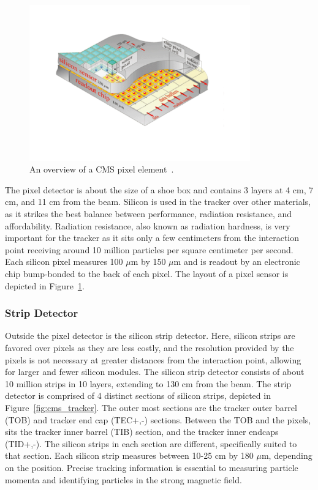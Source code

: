 \begin{figure}[hbtp]
 \begin{center}
   \includegraphics[width=0.85\textwidth]{ch3_figs/cms_pixel.pdf}
   \caption[CMS silicon pixel element]{An overview of a CMS pixel element~\cite{cms_pixel}.}
   \label{fig:cms_pixel}
 \end{center}
\end{figure}

\noindent The pixel detector is about the size of a shoe box and contains 3 layers at 4 cm, 7 cm, and 11 cm from the beam.
Silicon is used in the tracker over other materials, as it strikes the best balance between performance, radiation resistance, and affordability. 
Radiation resistance, also known as radiation hardness, is very important for the tracker as it sits only a few centimeters from the interaction point
receiving around 10 million particles per square centimeter per second.
Each silicon pixel measures 100 $\mu$m by 150 $\mu$m and is readout by an electronic chip bump-bonded to the back of each pixel. The layout of a pixel sensor is depicted in
Figure~\ref{fig:cms_pixel}.  

\subsubsection{Strip Detector}
Outside the pixel detector is the silicon strip detector. Here, silicon strips are favored over pixels as they are less costly, and the resolution provided by the pixels
is not necessary at greater distances from the interaction point, allowing for larger and fewer silicon modules.
The silicon strip detector consists of about 10 million strips in 10 layers, extending to 130 cm from the beam. 
The strip detector is comprised of 4 distinct sections of silicon strips, depicted in
Figure~\ref{fig:cms_tracker}. The outer most sections are the tracker outer barrel (TOB) and tracker end cap (TEC+,-) sections. 
Between the TOB and the pixels, sits the tracker
inner barrel (TIB) section, and the tracker inner endcaps (TID+,-).
The silicon strips in each section are different, specifically suited to that section.
Each silicon strip measures between 10-25 cm by 180 $\mu$m, depending on the position.
Precise tracking information is essential to measuring particle momenta and identifying particles in the strong magnetic field.

